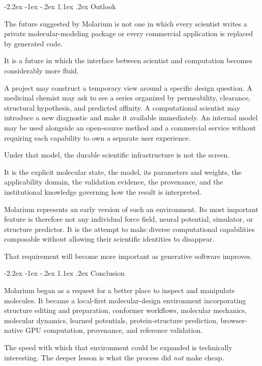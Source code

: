 \documentclass[11pt]{article}
\makeatletter
\renewcommand\section{\@startsection{section}{1}{\z@}%
  {-2.2ex \@plus -1ex \@minus -.2ex}%
  {1.1ex \@plus .2ex}%
  {\normalfont\Large\bfseries\color{molblue}}}
\makeatother
\begin{document}
\section{Outlook}

The future suggested by Molarium is not one in which every scientist writes a private molecular-modeling package or every commercial application is replaced by generated code.

It is a future in which the interface between scientist and computation becomes considerably more fluid.

A project may construct a temporary view around a specific design question. A medicinal chemist may ask to see a series organized by permeability, clearance, structural hypothesis, and predicted affinity. A computational scientist may introduce a new diagnostic and make it available immediately. An internal model may be used alongside an open-source method and a commercial service without requiring each capability to own a separate user experience.

Under that model, the durable scientific infrastructure is not the screen.

It is the explicit molecular state, the model, its parameters and weights, the applicability domain, the validation evidence, the provenance, and the institutional knowledge governing how the result is interpreted.

Molarium represents an early version of such an environment. Its most important feature is therefore not any individual force field, neural potential, simulator, or structure predictor. It is the attempt to make diverse computational capabilities composable without allowing their scientific identities to disappear.

That requirement will become more important as generative software improves.

\section{Conclusion}

Molarium began as a request for a better place to inspect and manipulate molecules. It became a local-first molecular-design environment incorporating structure editing and preparation, conformer workflows, molecular mechanics, molecular dynamics, learned potentials, protein-structure prediction, browser-native GPU computation, provenance, and reference validation.

The speed with which that environment could be expanded is technically interesting. The deeper lesson is what the process did \emph{not} make cheap.
\end{document}
